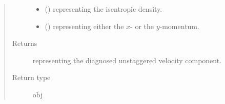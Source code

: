 \documentclass[letterpaper,10pt,english]{sphinxmanual}
\begin{document}
\begin{fulllineitems}
\begin{fulllineitems}
\begin{quote}
\begin{description}
\begin{itemize}
\item {} 
 () \textendash{}  representing the isentropic density.

\item {} 
 () \textendash{}  representing either the \(x\)- or the \(y\)-momentum.

\end{itemize}

\item[{Returns}] \leavevmode
{} representing the diagnosed unstaggered velocity component.

\item[{Return type}] \leavevmode
obj

\end{description}\end{quote}

\end{fulllineitems}


\end{fulllineitems}

\end{document}
